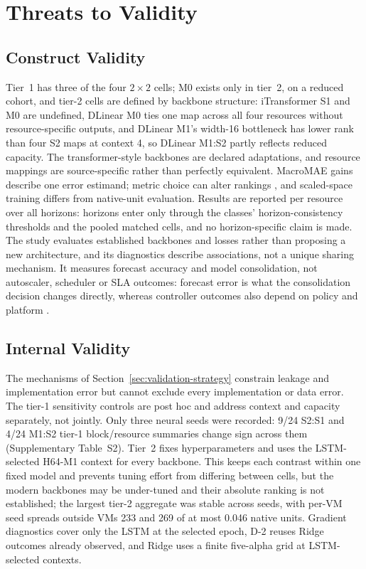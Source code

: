 \documentclass[5p,twocolumn]{elsarticle}
\begin{document}
\section{Threats to Validity}
\label{sec:threats}

\subsection{Construct Validity}
\label{sec:threats-construct}

Tier~1 has three of the four $2\times2$ cells; M0 exists only in tier~2, on a
reduced cohort, and tier-2 cells are defined by backbone structure:
iTransformer S1 and M0 are undefined, DLinear M0 ties one map across all four
resources without resource-specific outputs, and DLinear M1's width-16
bottleneck has lower rank than four S2 maps at context 4, so DLinear M1:S2
partly reflects reduced capacity. The transformer-style backbones are declared
adaptations, and resource mappings are source-specific rather than perfectly
equivalent. MacroMAE gains describe one error estimand; metric choice can
alter rankings \citep{Hyndman2006Accuracy}, and scaled-space training differs
from native-unit evaluation. Results are reported per resource over all
horizons: horizons enter only through the classes' horizon-consistency
thresholds and the pooled matched cells, and no horizon-specific claim is
made. The study evaluates established backbones and losses rather than
proposing a new architecture, and its diagnostics describe associations, not
a unique sharing mechanism. It measures forecast accuracy and model
consolidation, not autoscaler, scheduler or SLA outcomes: forecast error is
what the consolidation decision changes directly, whereas controller outcomes
also depend on policy and platform \citep{Qu2018Autoscaling}.

\subsection{Internal Validity}
\label{sec:threats-internal}

The mechanisms of Section~\ref{sec:validation-strategy} constrain leakage and
implementation error \citep{Cerqueira2020Evaluation,Hyndman2021Forecasting}
but cannot exclude every implementation or data error. The tier-1 sensitivity
controls are post hoc and address context and capacity separately, not
jointly. Only three neural seeds were recorded: 9/24 S2:S1 and 4/24 M1:S2
tier-1 block/resource summaries change sign across them (Supplementary
Table~S2). Tier~2 fixes hyperparameters and uses the LSTM-selected H64-M1
context for every backbone. This keeps each contrast within one fixed model
and prevents tuning effort from differing between cells, but the modern
backbones may be under-tuned and their absolute ranking is not established;
the largest tier-2 aggregate was stable across seeds, with per-VM seed spreads
outside VMs 233 and 269 of at most 0.046 native units. Gradient diagnostics
cover only the LSTM at the selected epoch, D-2 reuses Ridge outcomes already
observed, and Ridge uses a finite five-alpha grid at LSTM-selected contexts.
\end{document}
